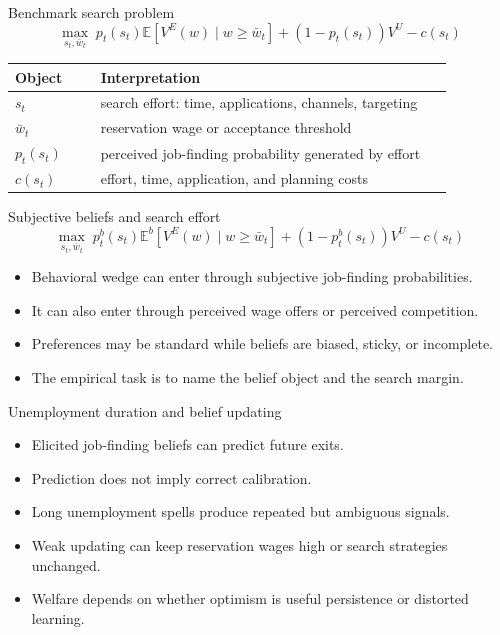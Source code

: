 \documentclass[aspectratio=169,11pt]{beamer}
\begin{document}
\begin{frame}{Benchmark search problem}
\[
\max_{s_t,\bar{w}_t}\;
p_t(s_t)\mathbb{E}\left[V^E(w)\mid w\ge \bar{w}_t\right]
+\left(1-p_t(s_t)\right)V^U-c(s_t)
\]

\small
\begin{tabular}{p{0.17\linewidth} p{0.70\linewidth}}
\toprule
Object & Interpretation \\
\midrule
$s_t$ & search effort: time, applications, channels, targeting \\
$\bar{w}_t$ & reservation wage or acceptance threshold \\
$p_t(s_t)$ & perceived job-finding probability generated by effort \\
$c(s_t)$ & effort, time, application, and planning costs \\
\bottomrule
\end{tabular}
\end{frame}

\begin{frame}{Subjective beliefs and search effort}
\[
\max_{s_t,\bar{w}_t}\;
p_t^b(s_t)\mathbb{E}^b\left[V^E(w)\mid w\ge \bar{w}_t\right]
+\left(1-p_t^b(s_t)\right)V^U-c(s_t)
\]

\begin{itemize}
    \item Behavioral wedge can enter through subjective job-finding probabilities.
    \item It can also enter through perceived wage offers or perceived competition.
    \item Preferences may be standard while beliefs are biased, sticky, or incomplete.
    \item The empirical task is to name the belief object and the search margin.
\end{itemize}
\end{frame}

\begin{frame}{Unemployment duration and belief updating}
\begin{itemize}
    \item Elicited job-finding beliefs can predict future exits.
    \item Prediction does not imply correct calibration.
    \item Long unemployment spells produce repeated but ambiguous signals.
    \item Weak updating can keep reservation wages high or search strategies unchanged.
    \item Welfare depends on whether optimism is useful persistence or distorted learning.
\end{itemize}
\end{frame}
\end{document}
